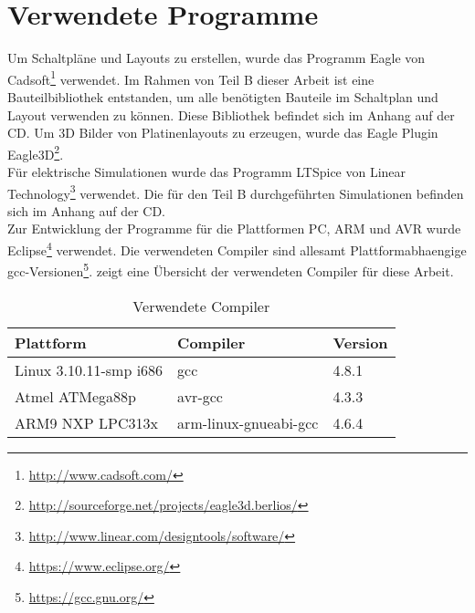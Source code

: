 \section{Verwendete Programme}
Um Schaltpläne und Layouts zu erstellen, wurde das Programm Eagle von Cadsoft\footnote{\url{http://www.cadsoft.com/}} verwendet. Im Rahmen von Teil B dieser Arbeit ist eine Bauteilbibliothek entstanden, um alle benötigten Bauteile im Schaltplan und Layout verwenden zu können. Diese Bibliothek befindet sich im Anhang auf der CD.
Um 3D Bilder von Platinenlayouts zu erzeugen, wurde das Eagle Plugin Eagle3D\footnote{\url{http://sourceforge.net/projects/eagle3d.berlios/}}.\\
Für elektrische Simulationen wurde das Programm LTSpice von Linear Technology\footnote{\url{http://www.linear.com/designtools/software/}} verwendet. Die für den Teil B durchgeführten Simulationen befinden sich im Anhang auf der CD.\\
Zur Entwicklung der Programme für die Plattformen PC, ARM und AVR wurde Eclipse\footnote{\url{https://www.eclipse.org/}} verwendet. Die verwendeten Compiler sind allesamt Plattformabhaengige gcc-Versionen\footnote{\url{https://gcc.gnu.org/}}.  zeigt eine Übersicht der verwendeten Compiler für diese Arbeit.

\begin{table}[h]
\begin{tabular}{|p{4.5cm}|p{4cm}|p{4cm}|}\hline
\rowcolor{TableBackgroundColor} 
\textbf{Plattform}		&	\textbf{Compiler}		&	\textbf{Version}  \\ \hline
 Linux 3.10.11-smp i686	&	gcc						& 4.8.1	\\ \hline
 Atmel ATMega88p		&	avr-gcc					& 4.3.3	\\ \hline
 ARM9 NXP LPC313x		&	arm-linux-gnueabi-gcc	& 4.6.4	\\ \hline
\end{tabular}
\caption{Verwendete Compiler}
\label{tab:verwendete_compiler}
\end{table}